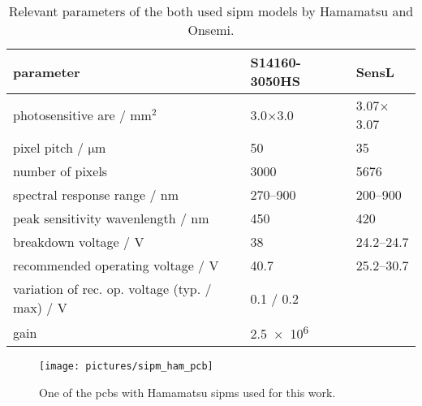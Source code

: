 \begin{table}
	\centering
	\caption[SiPM parameters]{Relevant parameters of the both used \ac{sipm} models by Hamamatsu and Onsemi. \cite{HamamatsuSiPM,SensLSiPM}}
	\label{tab:sipm_specs}
	\renewcommand{\arraystretch}{1.3}
	\begin{tabularx}{\textwidth}{Xp{}p{}}
	    \toprule
	    parameter								& S14160-3050HS		& SensL			\\\midrule
	    photosensitive are / $\si{\milli\meter\squared}$			& 3.0$\times$3.0	& 3.07$\times$3.07	\\
	    pixel pitch / $\si{\micro\meter}$					& 50			& 35			\\
	    number of pixels							& 3000			& \num{5676}		\\
	    spectral response range / $\si{\nano\meter}$			& \numrange{270}{900}	& \numrange{200}{900}	\\
	    peak sensitivity wavenlength / $\si{\nano\meter}$			& 450			& 420			\\
	    breakdown voltage / $\si{\volt}$					& 38			& \numrange{24.2}{24.7}	\\
	    recommended operating voltage / $\si{\volt}$			& 40.7			& \numrange{25.2}{30.7}	\\
	    variation of rec. op. voltage (typ. / max) / $\si{\volt}$		& 0.1 / 0.2		&			\\
	    gain								& \num{2.5e6}		&			\\
	    \bottomrule
	\end{tabularx}
	\renewcommand{\arraystretch}{1}
\end{table} 
\begin{figure}
	\centering
	\texttt{[image: pictures/sipm\_ham\_pcb]}
	\caption[\ac{pcb} with Hamamatsu \acp{sipm}]{One of the \acp{pcb} with Hamamatsu \acp{sipm} used for this work.}
	\label{fig:sipm_pcb}
\end{figure}

